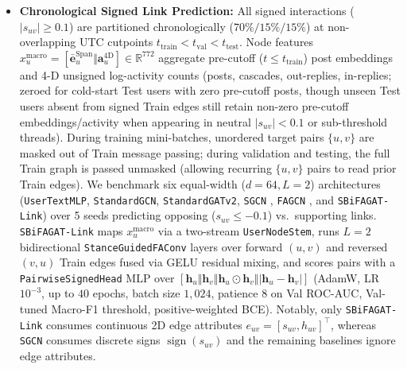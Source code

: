 \documentclass[conference]{IEEEtran}
\begin{document}
\begin{itemize}
    \item \textbf{Chronological Signed Link Prediction:} All signed interactions ($|s_{uv}| \ge 0.1$) are partitioned chronologically ($70\%/15\%/15\%$) at non-overlapping UTC cutpoints $t_{\text{train}} < t_{\text{val}} < t_{\text{test}}$. Node features $x_u^{\text{macro}} = [\bar{\mathbf{e}}_u^{\text{Span}} \Vert \mathbf{a}_u^{\text{4D}}] \in \mathbb{R}^{772}$ aggregate pre-cutoff ($t \le t_{\text{train}}$) post embeddings and 4-D unsigned log-activity counts (posts, cascades, out-replies, in-replies; zeroed for cold-start Test users with zero pre-cutoff posts, though unseen Test users absent from signed Train edges still retain non-zero pre-cutoff embeddings/activity when appearing in neutral $|s_{uv}| < 0.1$ or sub-threshold threads). During training mini-batches, unordered target pairs $\{u, v\}$ are masked out of Train message passing; during validation and testing, the full Train graph is passed unmasked (allowing recurring $\{u, v\}$ pairs to read prior Train edges). We benchmark six equal-width ($d=64, L=2$) architectures (\texttt{UserTextMLP}, \texttt{StandardGCN}, \texttt{StandardGATv2}, \texttt{SGCN} \cite{derr2018signed}, \texttt{FAGCN} \cite{bo2021beyond}, and \texttt{SBiFAGAT-Link}) over 5 seeds predicting opposing ($s_{uv} \le -0.1$) vs.\ supporting links. \texttt{SBiFAGAT-Link} maps $x_u^{\text{macro}}$ via a two-stream \texttt{UserNodeStem}, runs $L=2$ bidirectional \texttt{StanceGuidedFAConv} layers over forward $(u, v)$ and reversed $(v, u)$ Train edges fused via GELU residual mixing, and scores pairs with a \texttt{PairwiseSignedHead} MLP over $[\mathbf{h}_u \Vert \mathbf{h}_v \Vert \mathbf{h}_u \odot \mathbf{h}_v \Vert |\mathbf{h}_u - \mathbf{h}_v|]$ (AdamW, LR $10^{-3}$, up to $40$ epochs, batch size $1{,}024$, patience $8$ on Val ROC-AUC, Val-tuned Macro-F1 threshold, positive-weighted BCE). Notably, only \texttt{SBiFAGAT-Link} consumes continuous 2D edge attributes $e_{uv} = [s_{uv}, h_{uv}]^\top$, whereas \texttt{SGCN} consumes discrete signs $\operatorname{sign}(s_{uv})$ and the remaining baselines ignore edge attributes.
\end{itemize}
\end{document}
